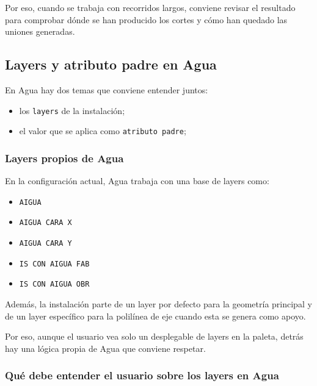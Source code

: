 Por eso, cuando se trabaja con recorridos largos, conviene revisar el resultado para comprobar dónde se han producido los cortes y cómo han quedado las uniones generadas.


\subsection{Layers y atributo padre en Agua}

En Agua hay dos temas que conviene entender juntos:

\begin{itemize}
\item los \texttt{layers} de la instalación;
\item el valor que se aplica como \texttt{atributo padre};
\end{itemize}

\subsubsection{Layers propios de Agua}

En la configuración actual, Agua trabaja con una base de layers como:

\begin{itemize}
\item \texttt{AIGUA}
\item \texttt{AIGUA CARA X}
\item \texttt{AIGUA CARA Y}
\item \texttt{IS CON AIGUA FAB}
\item \texttt{IS CON AIGUA OBR}
\end{itemize}

Además, la instalación parte de un layer por defecto para la geometría principal y de un layer específico para la polilínea de eje cuando esta se genera como apoyo.

Por eso, aunque el usuario vea solo un desplegable de layers en la paleta, detrás hay una lógica propia de Agua que conviene respetar.


\subsubsection{Qué debe entender el usuario sobre los layers en Agua}

